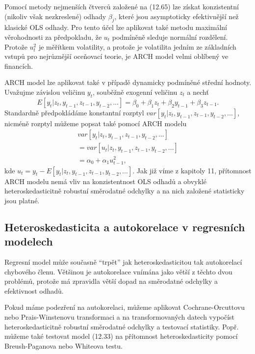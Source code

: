 Pomocí metody nejmenších čtverců založené na (12.65) lze získat konzistentní (nikoliv však nezkreslené) odhady $\beta_j$, které jsou asymptoticky efektivnější než klasické OLS odhady. Pro tento účel lze aplikovat také metodu maximální věrohodnosti za předpokladu, že $u_t$ podmíněně sleduje normální rozdělení. Protože $u_t^2$ je měřítkem volatility, a protože je volatilita jedním ze základních vstupů pro nejrůznější oceňovací teorie, je ARCH model velmi oblíbený ve financích.

ARCH model lze aplikovat také v případě dynamicky podmíněné střední hodnoty. Uvažujme závislou veličinu $y_t$, souběžně exogenní veličinu $z_t$ a nechť
\begin{equation}
E[y_t|z_t, y_{t-1}, z_{t-1}, y_{t-2}, ...] = \beta_0 + \beta_1 z_t + \beta_2 y_{t-1} + \beta_3 z_{t - 1}.
\end{equation}
Standardně předpokládáme konstantní rozptyl $var[y_t|z_t, y_{t - 1}, z_{t - 1}, y_{t - 2}, ...]$, nicméně rozptyl můžeme popsat také pomocí ARCH modelu
\begin{multline}
var[y_t|z_t, y_{t - 1}, z_{t - 1}, y_{t - 2}, ...]\\
= var[u_t|z_t, y_{t - 1}, z_{t - 1}, y_{t - 2}, ...]\\
= \alpha_0 + \alpha_1 u_{t - 1}^2,
\end{multline}
kde $u_t = y_t - E[y_t|z_t, y_{t - 1}, z_{t - 1}, y_{t - 2}, ...]$. Jak již víme z kapitoly 11, přítomnost ARCH modelu nemá vliv na konzistentnost OLS odhadů a obvyklé heteroskedasticitně robustní směrodatné odchylky a na nich založené statisticky jsou platné.

\subsection{Heteroskedasticita a autokorelace v regresních modelech}

Regresní model může současně ``trpět'' jak heteroskedasticitou tak autokorelací chybového členu. Většinou je autokorelace vnímána jako větší z těchto dvou problémů, protože má zpravidla větší dopad na směrodatné odchylky a efektivnost odhadů.

Pokud máme podezření na autokorelaci, můžeme aplikovat Cochrane-Orcuttovu nebo Prais-Winstenovu transformaci a na transformovaných datech vypočíst heteroskedasticitně robustní směrodatné odchylky a testovací statistiky. Popř. můžeme také testovat model (12.33) na přítomnost heteroskedasticity pomocí Breush-Paganova nebo Whiteova testu.


